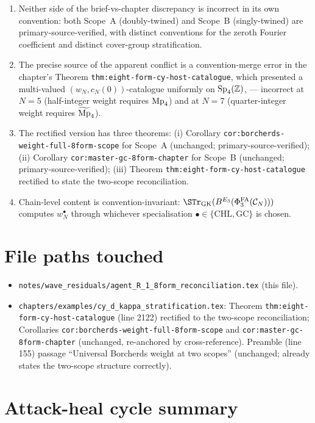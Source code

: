 \begin{enumerate}
\item Neither side of the brief-vs-chapter discrepancy is incorrect in
its own convention: both Scope~A (doubly-twined) and Scope~B
(singly-twined) are primary-source-verified, with distinct conventions
for the zeroth Fourier coefficient and distinct cover-group
stratification.
\item The precise source of the apparent conflict is a
convention-merge error in the chapter's Theorem
\texttt{thm:eight-form-cy-host-catalogue}, which presented a
multi-valued $(w_N, c_N(0))$-catalogue uniformly on $\mathrm{Sp}_4(\mathbb Z)$, ---
incorrect at $N = 5$ (half-integer weight requires $\mathrm{Mp}_4$) and
at $N = 7$ (quarter-integer weight requires $\widetilde{\mathrm{Mp}}_4$).
\item The rectified version has three theorems:
(i) Corollary \texttt{cor:borcherds-weight-full-8form-scope} for
Scope~A (unchanged; primary-source-verified);
(ii) Corollary \texttt{cor:master-gc-8form-chapter} for Scope~B
(unchanged; primary-source-verified);
(iii) Theorem \texttt{thm:eight-form-cy-host-catalogue}
rectified to state the two-scope reconciliation.
\item Chain-level content is convention-invariant:
$\STr_{\mathrm{GK}}(\BE{3}(\PhiFAt(\Cker_N)))$ computes $w_N^\bullet$
through whichever specialisation $\bullet \in \{\mathrm{CHL},
\mathrm{GC}\}$ is chosen.
\end{enumerate}

\section*{File paths touched}

\begin{itemize}
\item \texttt{notes/wave\_residuals/agent\_R\_1\_8form\_reconciliation.tex}
(this file).
\item \texttt{chapters/examples/cy\_d\_kappa\_stratification.tex}:
Theorem \texttt{thm:eight-form-cy-host-catalogue} (line 2122)
rectified to the two-scope reconciliation; Corollaries
\texttt{cor:borcherds-weight-full-8form-scope} and
\texttt{cor:master-gc-8form-chapter} (unchanged, re-anchored by
cross-reference). Preamble (line 155) passage ``Universal Borcherds
weight at two scopes'' (unchanged; already states the two-scope
structure correctly).
\end{itemize}

\section*{Attack-heal cycle summary}

